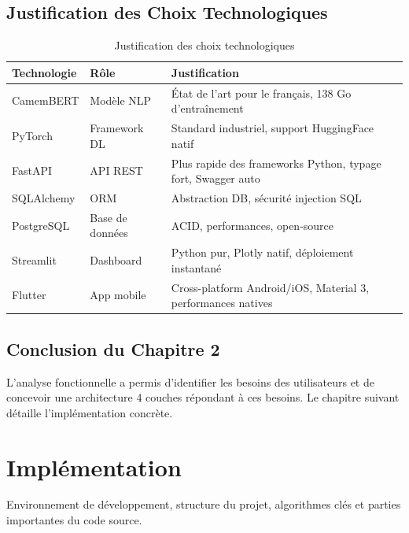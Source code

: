 \documentclass[12pt,a4paper,oneside]{report}
\begin{document}
\section{Justification des Choix Technologiques}

\begin{table}[H]
\centering
\caption{Justification des choix technologiques}
\label{tab:choix}
\renewcommand{\arraystretch}{1.5}
\begin{tabular}{p{2.4cm} p{2.8cm} p{7.5cm}}
\toprule
\rowcolor{bleuprincipal!15}
\textbf{Technologie} & \textbf{Rôle} & \textbf{Justification} \\
\midrule
CamemBERT & Modèle NLP & État de l'art pour le français, 138 Go d'entraînement \\
\rowcolor{gray!8}
PyTorch & Framework DL & Standard industriel, support HuggingFace natif \\
FastAPI & API REST & Plus rapide des frameworks Python, typage fort, Swagger auto \\
\rowcolor{gray!8}
SQLAlchemy & ORM & Abstraction DB, sécurité injection SQL \\
PostgreSQL & Base de données & ACID, performances, open-source \\
\rowcolor{gray!8}
Streamlit & Dashboard & Python pur, Plotly natif, déploiement instantané \\
Flutter & App mobile & Cross-platform Android/iOS, Material 3, performances natives \\
\bottomrule
\end{tabular}
\end{table}

\section*{Conclusion du Chapitre 2}
L'analyse fonctionnelle a permis d'identifier les besoins des utilisateurs
et de concevoir une architecture 4 couches répondant à ces besoins. Le
chapitre suivant détaille l'implémentation concrète.
\cleardoublepage

\chapter{Implémentation}

\begin{infobox}
Environnement de développement, structure du projet, algorithmes clés
et parties importantes du code source.
\end{infobox}
\end{document}
